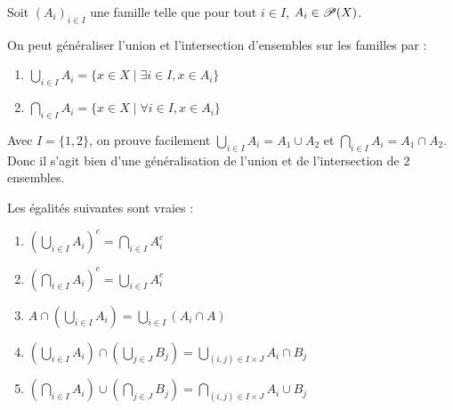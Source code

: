 \begin{definition}
Soit $(A_i)_{i\in I}$ une famille telle que pour tout $i\in I$, $A_i\in \mathscr{P}(X)$.

On peut généraliser l'union et l'intersection d'ensembles sur les familles par :
    \begin{enumerate}
    \item $\bigcup_{i\in I}A_i=\{x\in X \mid \exists i\in I, x\in A_i\}$
    \item $\bigcap_{i\in I}A_i=\{x\in X\mid \forall i\in I , x\in A_i\}$
    \end{enumerate}  
\end{definition}
\begin{remarque}
    Avec $I = \{1,2\}$, on prouve facilement $\bigcup_{i\in I}A_i = A_1\cup A_2$ et $\bigcap_{i\in I}A_i = A_1\cap A_2$. Donc il s'agit bien d'une généralisation de l'union et de l'intersection de $2$ ensembles.
\end{remarque}
\begin{proposition}\label{ens : opérations : propriétés}
    Les égalités suivantes sont vraies :
    \begin{enumerate}
        \item $\left(\bigcup_{i\in I}A_i\right)^c =\bigcap_{i\in I}A_i^c$
        \item $\left(\bigcap_{i\in I}A_i\right)^c =\bigcup_{i\in I}A_i^c$
        \item $A\cap\left(\bigcup _{i\in I}A_i\right)=\bigcup _{i\in I}(A_i\cap A)$
        \item $\left(\bigcup _{i\in I}A_i\right)\cap\left(\bigcup _{j\in J}B_j\right) =\bigcup _{(i,j)\in I\times J}A_i\cap B_j$
        \item $\left(\bigcap _{i\in I}A_i\right)\cup\left(\bigcap _{j\in J}B_j\right) =\bigcap _{(i,j)\in I\times J}A_i\cup B_j$
    \end{enumerate}
\end{proposition}
